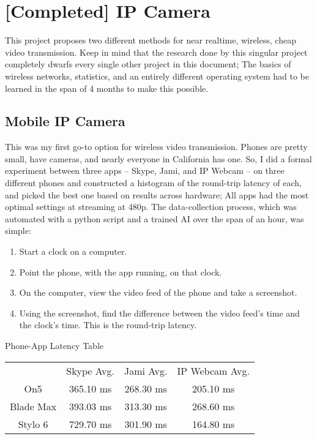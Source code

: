 \section{[Completed] IP Camera}

This project proposes two different methods for near realtime, wireless, cheap video transmission. Keep in mind that the research done by this singular project completely dwarfs every single other project in this document; The basics of wireless networks, statistics, and an entirely different operating system had to be learned in the span of 4 months to make this possible.

\subsection{Mobile IP Camera}

This was my first go-to option for wireless video transmission. Phones are pretty small, have cameras, and nearly everyone in California has one. So, I did a formal experiment between three apps -- Skype, Jami, and IP Webcam -- on three different phones and constructed a histogram of the round-trip latency of each, and picked the best one based on results across hardware; All apps had the most optimal settings at streaming at 480p. The data-collection process, which was automated with a python script and a trained AI over the span of an hour, was simple:

\begin{enumerate}
\item{Start a clock on a computer.}
\item{Point the phone, with the app running, on that clock.}
\item{On the computer, view the video feed of the phone and take a screenshot.}
\item{Using the screenshot, find the difference between the video feed's time and the clock's time. This is the round-trip latency. }
\end{enumerate}

\begin{centering}
Phone-App Latency Table\\[0.5cm]

\begin{tabular}{c|c|c|c}
    & Skype Avg. & Jami Avg. & IP Webcam Avg. \\[0.5cm]
    On5 & 365.10 ms & 268.30 ms & 205.10 ms \\[0.5cm]
    Blade Max & 393.03 ms & 313.30 ms & 268.60 ms \\[0.5cm]
    Stylo 6 & 729.70 ms & 301.90 ms & 164.80 ms
\end{tabular} \newline

\end{centering}


